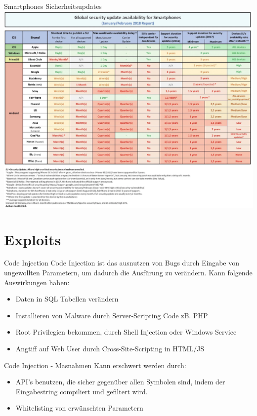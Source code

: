 \documentclass[10pt]{beamer}
\begin{document}
\begin{frame}[fragile]{Smartphones Sicherheitsupdates}
  \includegraphics[scale=0.5]{android_sub}
  \newline
\end{frame}


\section{Exploits}
\begin{frame}[fragile]{Code Injection}
  Code Injection ist das ausnutzen von Bugs durch Eingabe von ungewollten Parametern, um dadurch die Ausf\"urung zu ver\"andern.
  \newline
  Kann folgende Auswirkungen haben:
  \begin{itemize}
    \item Daten in SQL Tabellen ver\"andern
    \item Installieren von Malware durch Server-Scripting Code zB. PHP
    \item Root Privilegien bekommen, durch Shell Injection oder Windows Service
    \item Angtiff auf Web User durch Cross-Site-Scripting in HTML/JS
  \end{itemize}
\end{frame}

\begin{frame}[fragile]{Code Injection - Masnahmen}
  Kann erschwert werden durch:
  \begin{itemize}
    \item API's benutzen, die sicher gegen\"uber allen Symbolen sind, indem der Eingabestring compiliert und gefiltert wird.
    \item Whitelisting von erw\"unschten Parametern
  \end{itemize}
\end{frame}
\end{document}
